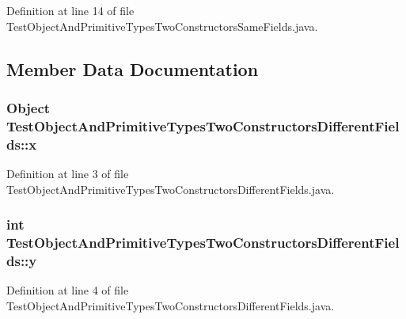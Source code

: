 Definition at line 14 of file TestObjectAndPrimitiveTypesTwoConstructorsSameFields.java.



\subsection{Member Data Documentation}
\hypertarget{classTestObjectAndPrimitiveTypesTwoConstructorsDifferentFields_acd6e4372ac5a3f095fe827a7649f4e01}{
\subsubsection[{x}]{\setlength{\rightskip}{0pt plus 5cm}Object {\bf TestObjectAndPrimitiveTypesTwoConstructorsDifferentFields::x}}}
\label{classTestObjectAndPrimitiveTypesTwoConstructorsDifferentFields_acd6e4372ac5a3f095fe827a7649f4e01}


Definition at line 3 of file TestObjectAndPrimitiveTypesTwoConstructorsDifferentFields.java.

\hypertarget{classTestObjectAndPrimitiveTypesTwoConstructorsDifferentFields_a78a43959fdccd99feddcc7042de33188}{
\subsubsection[{y}]{\setlength{\rightskip}{0pt plus 5cm}int {\bf TestObjectAndPrimitiveTypesTwoConstructorsDifferentFields::y}}}
\label{classTestObjectAndPrimitiveTypesTwoConstructorsDifferentFields_a78a43959fdccd99feddcc7042de33188}


Definition at line 4 of file TestObjectAndPrimitiveTypesTwoConstructorsDifferentFields.java.



